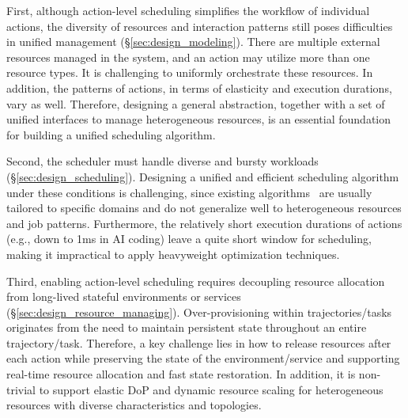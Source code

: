 First, although action-level scheduling simplifies the workflow of individual actions, the diversity of resources and interaction patterns still poses difficulties in unified management (\S\ref{sec:design_modeling}). 
There are multiple external resources managed in the system, and an action may utilize more than one resource types. It is challenging to uniformly orchestrate these resources.
In addition, the patterns of actions, in terms of elasticity and execution durations, vary as well.
Therefore, designing a general abstraction, together with a set of unified interfaces to manage heterogeneous resources, is an essential foundation for building a unified scheduling algorithm.

Second, the scheduler must handle diverse and bursty workloads (\S\ref{sec:design_scheduling}).
Designing a unified and efficient scheduling algorithm under these conditions is challenging, since existing algorithms~\citep{grandl2016graphene,han2022microsecond,liu2024muxflow} are usually tailored to specific domains and do not generalize well to heterogeneous resources and job patterns.
Furthermore, the relatively short execution durations of actions (e.g., down to 1ms in AI coding) leave a quite short window for scheduling, making it impractical to apply heavyweight optimization techniques. %

Third, enabling action-level scheduling requires decoupling resource allocation from long-lived stateful environments or services (\S\ref{sec:design_resource_managing}). Over-provisioning within trajectories/tasks originates from the need to maintain persistent state throughout an entire trajectory/task.
Therefore, a key challenge lies in how to release resources after each action while preserving the state of the environment/service and supporting real-time resource allocation and fast state restoration. 
In addition, it is non-trivial to support elastic DoP and dynamic resource scaling for heterogeneous resources with diverse characteristics and topologies.

